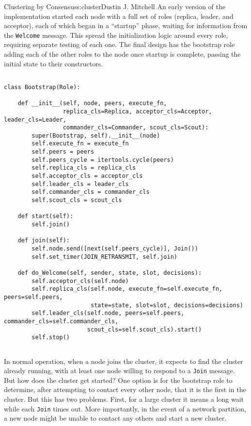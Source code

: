 \begin{aosachapter}{Clustering by Consensus}{s:cluster}{Dustin J. Mitchell}
An early version of the implementation started each node with a full set
of roles (replica, leader, and acceptor), each of which began in a
``startup'' phase, waiting for information from the \texttt{Welcome}
message. This spread the initialization logic around every role,
requiring separate testing of each one. The final design has the
bootstrap role adding each of the other roles to the node once startup
is complete, passing the initial state to their constructors.

\begin{verbatim}

class Bootstrap(Role):

    def __init__(self, node, peers, execute_fn,
                 replica_cls=Replica, acceptor_cls=Acceptor, leader_cls=Leader,
                 commander_cls=Commander, scout_cls=Scout):
        super(Bootstrap, self).__init__(node)
        self.execute_fn = execute_fn
        self.peers = peers
        self.peers_cycle = itertools.cycle(peers)
        self.replica_cls = replica_cls
        self.acceptor_cls = acceptor_cls
        self.leader_cls = leader_cls
        self.commander_cls = commander_cls
        self.scout_cls = scout_cls

    def start(self):
        self.join()

    def join(self):
        self.node.send([next(self.peers_cycle)], Join())
        self.set_timer(JOIN_RETRANSMIT, self.join)

    def do_Welcome(self, sender, state, slot, decisions):
        self.acceptor_cls(self.node)
        self.replica_cls(self.node, execute_fn=self.execute_fn, peers=self.peers,
                         state=state, slot=slot, decisions=decisions)
        self.leader_cls(self.node, peers=self.peers, commander_cls=self.commander_cls,
                        scout_cls=self.scout_cls).start()
        self.stop()
    
\end{verbatim}

\label{seed}

In normal operation, when a node joins the cluster, it expects to find
the cluster already running, with at least one node willing to respond
to a \texttt{Join} message. But how does the cluster get started? One
option is for the bootstrap role to determine, after attempting to
contact every other node, that it is the first in the cluster. But this
has two problems. First, for a large cluster it means a long wait while
each \texttt{Join} times out. More importantly, in the event of a
network partition, a new node might be unable to contact any others and
start a new cluster.


\end{aosachapter}
